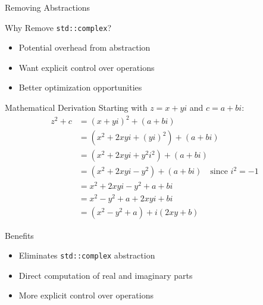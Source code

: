 \documentclass{beamer}
\begin{document}
\begin{frame}{Removing Abstractions}
    \begin{block}{Why Remove \texttt{std::complex}?}
        \begin{itemize}
            \item Potential overhead from abstraction
            \item Want explicit control over operations
            \item Better optimization opportunities
        \end{itemize}
    \end{block}
    \begin{block}{Mathematical Derivation}
    \small
    Starting with $z = x + yi$ and $c = a + bi$:
        \begin{align}
        z^2 + c 
        &= (x + yi)^2 + (a + bi) \nonumber\\
        &= (x^2 + 2xyi + (yi)^2) + (a + bi) \nonumber\\
        &= (x^2 + 2xyi + y^2i^2) + (a + bi) \nonumber\\
        &= (x^2 + 2xyi - y^2) + (a + bi) \quad \text{since } i^2 = -1 \nonumber\\
        &= x^2 + 2xyi - y^2 + a + bi \nonumber\\
        &= x^2 - y^2 + a + 2xyi + bi \nonumber\\
        &= (x^2 - y^2 + a) + i(2xy + b) \nonumber
        \end{align}
    \end{block}
    
    \begin{block}{Benefits}
        \begin{itemize}
            \item Eliminates \texttt{std::complex} abstraction
            \item Direct computation of real and imaginary parts
            \item More explicit control over operations
        \end{itemize}
    \end{block}
\end{frame}
\end{document}
